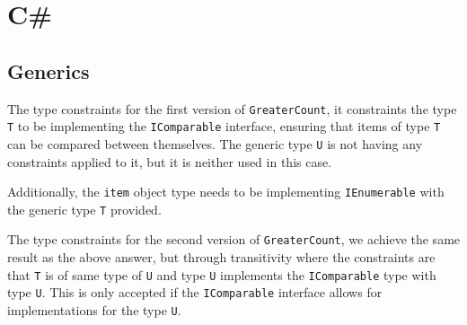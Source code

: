 \documentclass[12pt,letterpaper]{article}
\begin{document}
\section{C\#}
\subsection{Generics}
The type constraints for the first version of \lstinline{GreaterCount}, it constraints the type
\lstinline{T} to be implementing the \lstinline{IComparable} interface, ensuring that items of type \lstinline{T}
can be compared between themselves. The generic type \lstinline{U} is not having any constraints applied to it,
but it is neither used in this case. 

Additionally, the \lstinline{item} object type needs to be implementing \lstinline{IEnumerable} with the 
generic type \lstinline{T} provided.

The type constraints for the second version of \lstinline{GreaterCount}, we achieve the same result as the above answer,
but through transitivity where the constraints are that \lstinline{T} is of same type of \lstinline{U} and type \lstinline{U} 
implements the \lstinline{IComparable} type with type \lstinline{U}. This is only accepted if the \lstinline{IComparable} interface
allows for implementations for the type \lstinline{U}.
\end{document}
